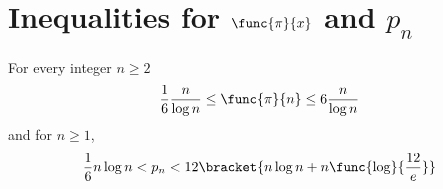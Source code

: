 \section{Inequalities for \(\func{\pi}{x}\) and \(p_n\)}
\begin{theorem}
    For every integer \(n \geq 2\)
    \begin{equation*}
        \dfrac{1}{6} \dfrac{n}{\log n} \leq \func{\pi}{n} \leq 6 \dfrac{n}{\log n}
    \end{equation*}
    and for \(n \geq 1\), 
    \begin{equation*}
        \dfrac{1}{6}n \log n < p_n < 12 \bracket{n \log n + n \func{\log}{\frac{12}{e}}}
    \end{equation*}
\end{theorem}